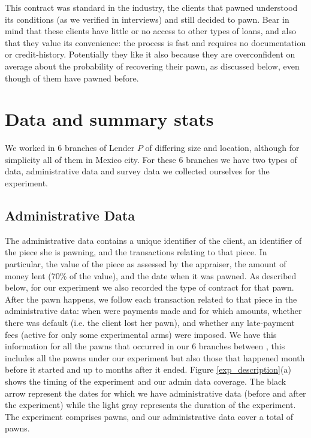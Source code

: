 \documentclass[11pt]{article}
\begin{document}
This contract was standard in the industry, the clients that pawned understood its conditions (as we verified in interviews) and still decided to pawn. Bear in mind that these clients have little or no access to other types of loans, and also that they value its convenience: the process is fast and requires no documentation or credit-history. Potentially they like it also because they are overconfident on average about the probability of recovering their pawn, as discussed below, even though  of them have pawned before.

    
\section{Data and summary stats}
    
We worked in 6 branches of Lender $P$ of differing size and location, although for simplicity all of them in Mexico city. For these 6 branches we have two types of data, administrative data and survey data we collected ourselves for the experiment. 

\subsection{Administrative Data}
The administrative data contains a unique identifier of the client, an identifier of the piece she is pawning, and the transactions relating to that piece. In particular, the value of the piece as assessed by the appraiser, the amount of money lent (70\% of the value), and the date when it was pawned. As described below, for our experiment we also recorded the type of contract for that pawn. After the pawn happens, we follow each transaction related to that piece in the administrative data: when were payments made and for which amounts, whether there was default (i.e. the client lost her pawn), and whether any late-payment fees (active for only some experimental arms) were imposed. We have this information for all the pawns that occurred in our 6 branches between , this includes all the pawns under our experiment but also those that happened  month before it started and up to  months after it ended. Figure \ref{exp_description}(a) shows the timing of the experiment and our admin data coverage. The black arrow represent the dates for which we have administrative data (before and after the experiment) while the light gray represents the duration of the experiment. The experiment comprises  pawns, and our administrative data cover a total of  pawns.
\end{document}

